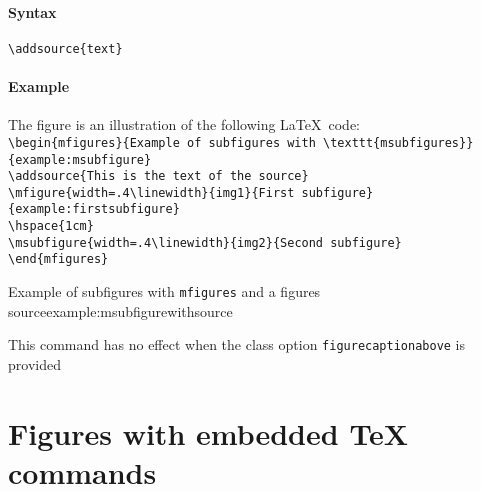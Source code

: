 \documentclass[book,taskpackage,specpackage,codepackage]{upmethodology-document}
\begin{document}
\paragraph{Syntax} \texttt{{\textbackslash}addsource\{text\}}

\paragraph{Example} The figure  is an illustration of the following \LaTeX\ code: \\
\texttt{{\textbackslash}begin\{mfigures\}\{Example of subfigures with {\textbackslash}texttt\{msubfigures\}\}\{example:msubfigure\}}\\
\texttt{{\textbackslash}addsource\{This is the text of the source\}}\\
\texttt{{\textbackslash}mfigure\{width=.4{\textbackslash}linewidth\}\{img1\}\{First subfigure\}\{example:firstsubfigure\}} \\
\texttt{{\textbackslash}hspace\{1cm\}} \\
\texttt{{\textbackslash}msubfigure\{width=.4{\textbackslash}linewidth\}\{img2\}\{Second subfigure\}} \\
\texttt{{\textbackslash}end\{mfigures\}}

\begin{mfigures}{Example of subfigures with \texttt{mfigures} and a figures source}{example:msubfigurewithsource}
	\hspace{1cm}
\end{mfigures}

\begin{upmcaution}
	This command has no effect when the class option \texttt{figurecaptionabove} is provided
\end{upmcaution}

\section{Figures with embedded \TeX\xspace commands}
\end{document}
